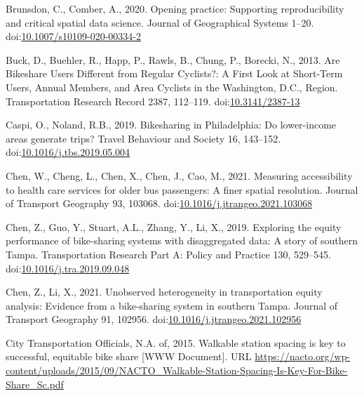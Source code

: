 \documentclass[]{elsarticle} %
\begin{document}
\leavevmode\hypertarget{ref-brunsdon2020opening}{}%
Brunsdon, C., Comber, A., 2020. Opening practice: Supporting
reproducibility and critical spatial data science. Journal of
Geographical Systems 1--20.
doi:\href{https://doi.org/10.1007/s10109-020-00334-2}{10.1007/s10109-020-00334-2}

\leavevmode\hypertarget{ref-buckAreBikeshareUsers2013}{}%
Buck, D., Buehler, R., Happ, P., Rawls, B., Chung, P., Borecki, N.,
2013. Are Bikeshare Users Different from Regular Cyclists?: A First Look
at Short-Term Users, Annual Members, and Area Cyclists in the
Washington, D.C., Region. Transportation Research Record 2387, 112--119.
doi:\href{https://doi.org/10.3141/2387-13}{10.3141/2387-13}

\leavevmode\hypertarget{ref-caspiBikesharingPhiladelphiaLowerincome2019}{}%
Caspi, O., Noland, R.B., 2019. Bikesharing in Philadelphia: Do
lower-income areas generate trips? Travel Behaviour and Society 16,
143--152.
doi:\href{https://doi.org/10.1016/j.tbs.2019.05.004}{10.1016/j.tbs.2019.05.004}

\leavevmode\hypertarget{ref-chenMeasuringAccessibilityHealth2021}{}%
Chen, W., Cheng, L., Chen, X., Chen, J., Cao, M., 2021. Measuring
accessibility to health care services for older bus passengers: A finer
spatial resolution. Journal of Transport Geography 93, 103068.
doi:\href{https://doi.org/10.1016/j.jtrangeo.2021.103068}{10.1016/j.jtrangeo.2021.103068}

\leavevmode\hypertarget{ref-chenExploringEquityPerformance2019}{}%
Chen, Z., Guo, Y., Stuart, A.L., Zhang, Y., Li, X., 2019. Exploring the
equity performance of bike-sharing systems with disaggregated data: A
story of southern Tampa. Transportation Research Part A: Policy and
Practice 130, 529--545.
doi:\href{https://doi.org/10.1016/j.tra.2019.09.048}{10.1016/j.tra.2019.09.048}

\leavevmode\hypertarget{ref-chenUnobservedHeterogeneityTransportation2021}{}%
Chen, Z., Li, X., 2021. Unobserved heterogeneity in transportation
equity analysis: Evidence from a bike-sharing system in southern Tampa.
Journal of Transport Geography 91, 102956.
doi:\href{https://doi.org/10.1016/j.jtrangeo.2021.102956}{10.1016/j.jtrangeo.2021.102956}

\leavevmode\hypertarget{ref-nactowalkingstation2015}{}%
City Transportation Officials, N.A. of, 2015. Walkable station spacing
is key to successful, equitable bike share {[}WWW Document{]}. URL
\url{https://nacto.org/wp-content/uploads/2015/09/NACTO_Walkable-Station-Spacing-Is-Key-For-Bike-Share_Sc.pdf}
\end{document}
